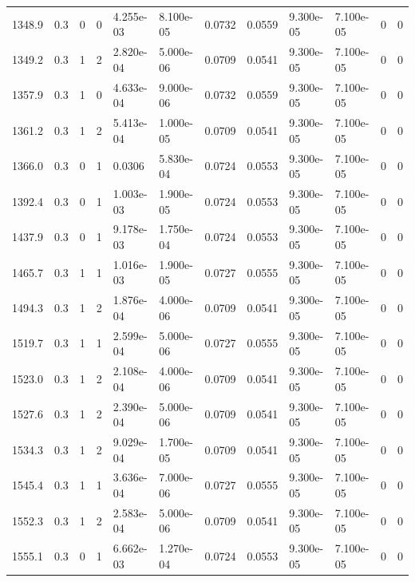 \documentclass[preview]{standalone}
\begin{document}
{{{\begin{tabular}{L{1.2cm}C{1.2cm} C{0.3cm}C{0.5cm} C{1.4cm}C{1.4cm} C{1.4cm}C{1.4cm} C{1.6cm}C{1.6cm} C{1.6cm}C{1.6cm}}
  1348.9  &   0.3  & 0     &  0 &  4.255e-03  & 8.100e-05  &  0.0732&   0.0559& 9.300e-05 & 7.100e-05   &  0 & 0  \\ 
  1349.2  &   0.3  & 1     &  2 &  2.820e-04  & 5.000e-06  &  0.0709&   0.0541& 9.300e-05 & 7.100e-05   &  0 & 0  \\ 
  1357.9  &   0.3  & 1     &  0 &  4.633e-04  & 9.000e-06  &  0.0732&   0.0559& 9.300e-05 & 7.100e-05   &  0 & 0  \\ 
  1361.2  &   0.3  & 1     &  2 &  5.413e-04  & 1.000e-05  &  0.0709&   0.0541& 9.300e-05 & 7.100e-05   &  0 & 0  \\ 
  1366.0  &   0.3  & 0     &  1 &  0.0306  & 5.830e-04  &  0.0724&   0.0553& 9.300e-05 & 7.100e-05   &  0 & 0  \\ 
  1392.4  &   0.3  & 0     &  1 &  1.003e-03  & 1.900e-05  &  0.0724&   0.0553& 9.300e-05 & 7.100e-05   &  0 & 0  \\ 
  1437.9  &   0.3  & 0     &  1 &  9.178e-03  & 1.750e-04  &  0.0724&   0.0553& 9.300e-05 & 7.100e-05   &  0 & 0  \\ 
  1465.7  &   0.3  & 1     &  1 &  1.016e-03  & 1.900e-05  &  0.0727&   0.0555& 9.300e-05 & 7.100e-05   &  0 & 0  \\ 
  1494.3  &   0.3  & 1     &  2 &  1.876e-04  & 4.000e-06  &  0.0709&   0.0541& 9.300e-05 & 7.100e-05   &  0 & 0  \\ 
  1519.7  &   0.3  & 1     &  1 &  2.599e-04  & 5.000e-06  &  0.0727&   0.0555& 9.300e-05 & 7.100e-05   &  0 & 0  \\ 
  1523.0  &   0.3  & 1     &  2 &  2.108e-04  & 4.000e-06  &  0.0709&   0.0541& 9.300e-05 & 7.100e-05   &  0 & 0  \\ 
  1527.6  &   0.3  & 1     &  2 &  2.390e-04  & 5.000e-06  &  0.0709&   0.0541& 9.300e-05 & 7.100e-05   &  0 & 0  \\ 
  1534.3  &   0.3  & 1     &  2 &  9.029e-04  & 1.700e-05  &  0.0709&   0.0541& 9.300e-05 & 7.100e-05   &  0 & 0  \\ 
  1545.4  &   0.3  & 1     &  1 &  3.636e-04  & 7.000e-06  &  0.0727&   0.0555& 9.300e-05 & 7.100e-05   &  0 & 0  \\ 
  1552.3  &   0.3  & 1     &  2 &  2.583e-04  & 5.000e-06  &  0.0709&   0.0541& 9.300e-05 & 7.100e-05   &  0 & 0  \\ 
  1555.1  &   0.3  & 0     &  1 &  6.662e-03  & 1.270e-04  &  0.0724&   0.0553& 9.300e-05 & 7.100e-05   &  0 & 0  \\ 
\hline 
\end{tabular} 

}}}
\end{document}
